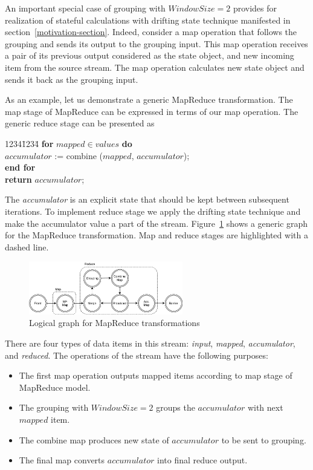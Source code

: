 \label{fs-drifting}

An important special case of grouping with $Window Size = 2$  provides for realization of stateful calculations with drifting state technique manifested in section~\ref{motivation-section}. Indeed, consider a map operation that follows the grouping and sends its output to the grouping input. This map operation receives a pair of its previous output considered as the state object, and new incoming item from the source stream. The map operation calculates new state object and sends it back as the grouping input. 

As an example, let us demonstrate a generic MapReduce transformation. The map stage of MapReduce can be expressed in terms of our map operation. The generic reduce stage can be presented as

\begin {tabbing}
1234\=1234\= \kill
{\bf for} $mapped \in values$ {\bf do}   \\
\>$accumulator$ := combine ($mapped$, $accumulator$); \\
{\bf end for} \\
{\bf return } $accumulator$;
\end {tabbing}

The {\it accumulator} is an explicit state that should be kept between subsequent iterations. To implement reduce stage we apply the drifting state technique and make the accumulator value a part of the stream. Figure~\ref{mapreduce-graph-figure} shows a generic graph for the MapReduce transformation. Map and reduce stages are highlighted with a dashed line. 

\begin{figure}[ht]
  \centering
  \includegraphics[width=0.6\textwidth]{pics/mapreduce}
  \caption{Logical graph for MapReduce transformations}
  \label {mapreduce-graph-figure}
\end{figure}

There are four types of data items in this stream: {\em input}, {\em mapped}, {\em accumulator}, and {\em reduced}. The operations of the stream have the following purposes:

\begin{itemize}
  \item The first map operation outputs mapped items according to map stage of MapReduce model.
  
  \item The grouping with $WindowSize=2$ groups the $accumulator$ with next $mapped$ item. 
  
  \item The combine map produces new state of $accumulator$ to be sent to grouping.
  
  \item The final map converts $accumulator$ into final reduce output.
\end{itemize}

